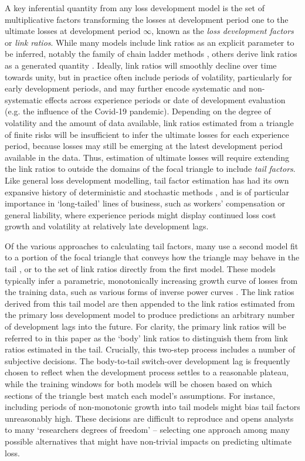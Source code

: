 A key inferential quantity from any loss development
model is the set of multiplicative factors transforming 
the losses at development period one to
the ultimate losses at development period $\infty$,
known as the \textit{loss development factors} or \textit{link ratios}. 
While many models include link ratios as an explicit parameter to be 
inferred, notably the family of chain ladder methods
\citep[e.g.][]{mack1993,englandverrall2002},
others derive link ratios as a generated quantity \citep{englandverrall2001,meyers2015}. 
Ideally, link ratios will smoothly decline over time towards unity,
but in practice often include periods of volatility, particularly
for early development periods, and may further encode systematic
and non-systematic effects across experience periods or date of
development evaluation (e.g. the influence of the Covid-19 pandemic).
Depending on the degree of volatility and the amount of data available,
link ratios estimated from a triangle of finite
risks will be insufficient to infer the ultimate losses for each experience period,
because losses may still be emerging at the latest development period available
in the data. Thus, estimation of ultimate losses will require extending the link ratios
to outside the domains of the focal triangle to include \textit{tail factors}.
Like general loss development modelling, tail factor estimation has had its own expansive history
of deterministic and stochastic methods \citep{tailfactors2013}, and is of particular
importance in `long-tailed' lines of business, such as workers' compensation or general
liability, where experience periods might display continued loss cost growth and 
volatility at relatively late development lags.

Of the various approaches to calculating tail factors, many 
use a second model fit to a portion
of the focal triangle that conveys how the triangle may behave
in the tail \citep{tailfactors2013}, or to the set of link ratios
directly from the first model. These models typically 
infer a parametric, monotonically
increasing growth curve of losses from the training data, 
such as various forms of
inverse power curves \citep[e.g.][]{sherman1984,evans2015,clark2017}.
The link ratios derived from this tail model are then appended to
the link ratios estimated from the primary loss development model
to produce predictions an
arbitrary number of development lags into the future.
For clarity, the primary link ratios will be referred to
in this paper as the `body' link ratios to distinguish them from 
link ratios estimated in the tail.
Crucially, this two-step process includes a number of 
subjective decisions. 
The body-to-tail
switch-over development lag is frequently chosen
to reflect when the development process settles to a
reasonable plateau, while the training windows for
both models will be chosen based on which sections of
the triangle best match each model's assumptions.
For instance, including periods
of non-monotonic growth into tail models might bias
tail factors unreasonably high. These decisions
are difficult to reproduce and
opens analysts to many `researchers degrees of freedom' \citep{simmons2011}
 -- selecting one approach among many possible
 alternatives that might have non-trivial impacts
 on predicting ultimate loss.

